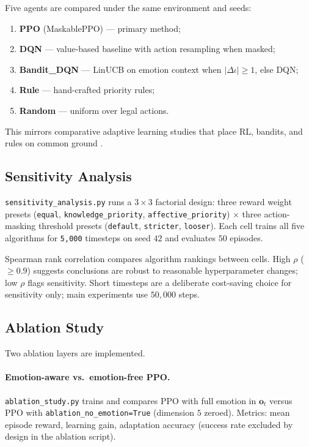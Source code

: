 Five agents are compared under the same environment and seeds:
\begin{enumerate}
    \item \textbf{PPO} (MaskablePPO) --- primary method;
    \item \textbf{DQN} --- value-based baseline with action resampling when masked;
    \item \textbf{Bandit\_DQN} --- LinUCB on emotion context when $|\Delta \iota| \geq 1$, else DQN;
    \item \textbf{Rule} --- hand-crafted priority rules;
    \item \textbf{Random} --- uniform over legal actions.
\end{enumerate}
This mirrors comparative adaptive learning studies that place RL, bandits, and rules on common ground \cite{azoulay_adaptive_2021}.

\subsection{Sensitivity Analysis}\label{sec:method_sensitivity}

\texttt{sensitivity\_analysis.py} runs a $3 \times 3$ factorial design: three reward weight presets (\texttt{equal}, \texttt{knowledge\_priority}, \texttt{affective\_priority}) $\times$ three action-masking threshold presets (\texttt{default}, \texttt{stricter}, \texttt{looser}). Each cell trains all five algorithms for \texttt{5{,}000} timesteps on seed $42$ and evaluates $50$ episodes.

Spearman rank correlation compares algorithm rankings between cells. High $\rho$ ($\geq 0.9$) suggests conclusions are robust to reasonable hyperparameter changes; low $\rho$ flags sensitivity. Short timesteps are a deliberate cost-saving choice for sensitivity only; main experiments use $50{,}000$ steps.

\subsection{Ablation Study}\label{sec:method_ablation}

Two ablation layers are implemented.

\paragraph{Emotion-aware vs.\ emotion-free PPO.}
\texttt{ablation\_study.py} trains and compares PPO with full emotion in $\mathbf{o}_t$ versus PPO with \texttt{ablation\_no\_emotion=True} (dimension $5$ zeroed). Metrics: mean episode reward, learning gain, adaptation accuracy (success rate excluded by design in the ablation script).

